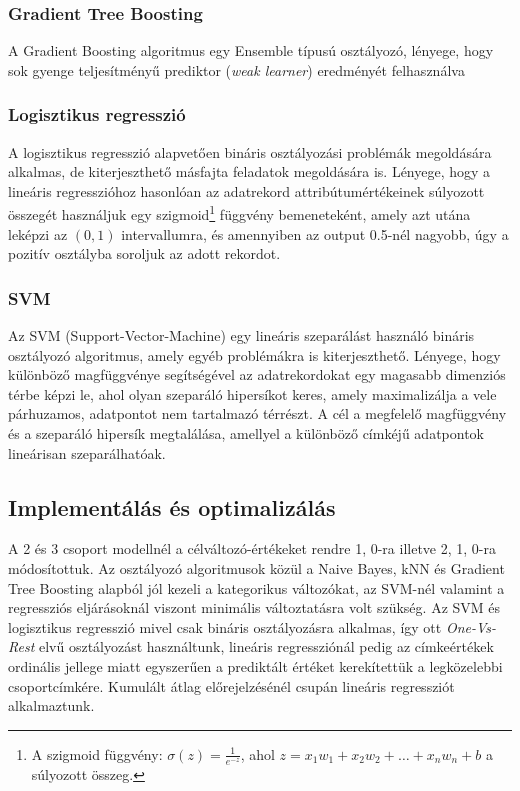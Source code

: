 \documentclass[12pt]{article}
\begin{document}
\subsubsection{Gradient Tree Boosting}

A Gradient Boosting algoritmus egy Ensemble típusú osztályozó, lényege, hogy sok gyenge teljesítményű prediktor (\textit{weak learner}) eredményét felhasználva

\subsubsection{Logisztikus regresszió}

A logisztikus regresszió alapvetően bináris osztályozási problémák megoldására alkalmas, de kiterjeszthető másfajta feladatok megoldására is. Lényege, hogy a lineáris regresszióhoz hasonlóan az adatrekord attribútumértékeinek súlyozott összegét használjuk egy szigmoid\footnote{A szigmoid függvény: $\sigma(z)=\frac{1}{e^{-z}}$, ahol $z=x_1w_1+x_2w_2+ \dots +x_nw_n+b$ a súlyozott összeg.} függvény bemeneteként, amely azt utána leképzi az $\left(0,1\right)$ intervallumra, és amennyiben az output 0.5-nél nagyobb, úgy a pozitív osztályba soroljuk az adott rekordot.

\subsubsection{SVM}

Az SVM (Support-Vector-Machine) egy lineáris szeparálást használó bináris osztályozó algoritmus, amely egyéb problémákra is kiterjeszthető. Lényege, hogy különböző magfüggvénye segítségével az adatrekordokat egy magasabb dimenziós térbe képzi le, ahol olyan szeparáló hipersíkot keres, amely maximalizálja a vele párhuzamos, adatpontot nem tartalmazó térrészt. A cél a megfelelő magfüggvény és a szeparáló hipersík megtalálása, amellyel a különböző címkéjű adatpontok lineárisan szeparálhatóak.




\subsection{Implementálás és optimalizálás}

A 2 és 3 csoport modellnél a célváltozó-értékeket rendre 1, 0-ra illetve 2, 1, 0-ra módosítottuk. Az osztályozó algoritmusok közül a Naive Bayes, kNN és Gradient Tree Boosting alapból jól kezeli a kategorikus változókat, az SVM-nél valamint a regressziós eljárásoknál viszont minimális változtatásra volt szükség. Az SVM és logisztikus regresszió mivel csak bináris osztályozásra alkalmas, így ott \textit{One-Vs-Rest} elvű osztályozást használtunk, lineáris regressziónál pedig az címkeértékek ordinális jellege miatt egyszerűen a prediktált értéket kerekítettük a legközelebbi csoportcímkére. Kumulált átlag előrejelzésénél csupán lineáris regressziót alkalmaztunk.
\end{document}
